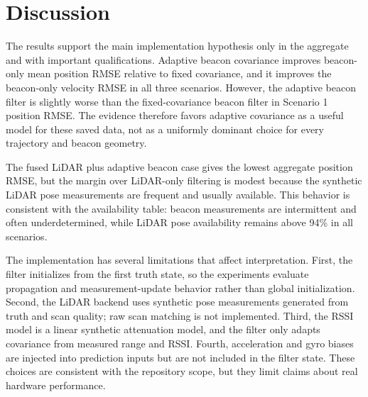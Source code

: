 \section{Discussion}

The results support the main implementation hypothesis only in the aggregate and with important qualifications. Adaptive beacon covariance improves beacon-only mean position RMSE relative to fixed covariance, and it improves the beacon-only velocity RMSE in all three scenarios. However, the adaptive beacon filter is slightly worse than the fixed-covariance beacon filter in Scenario 1 position RMSE. The evidence therefore favors adaptive covariance as a useful model for these saved data, not as a uniformly dominant choice for every trajectory and beacon geometry.

The fused LiDAR plus adaptive beacon case gives the lowest aggregate position RMSE, but the margin over LiDAR-only filtering is modest because the synthetic LiDAR pose measurements are frequent and usually available. This behavior is consistent with the availability table: beacon measurements are intermittent and often underdetermined, while LiDAR pose availability remains above 94\% in all scenarios.

The implementation has several limitations that affect interpretation. First, the filter initializes from the first truth state, so the experiments evaluate propagation and measurement-update behavior rather than global initialization. Second, the LiDAR backend uses synthetic pose measurements generated from truth and scan quality; raw scan matching is not implemented. Third, the RSSI model is a linear synthetic attenuation model, and the filter only adapts covariance from measured range and RSSI. Fourth, acceleration and gyro biases are injected into prediction inputs but are not included in the filter state. These choices are consistent with the repository scope, but they limit claims about real hardware performance.
